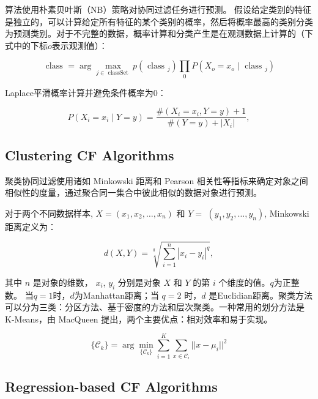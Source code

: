 \documentclass[sigconf]{acmart}
\begin{document}
算法使用朴素贝叶斯（NB）策略对协同过滤任务进行预测。 假设给定类别的特征是独立的，可以计算给定所有特征的某个类别的概率，然后将概率最高的类别分类为预测类别\cite{miyahara2002improvement}。对于不完整的数据，概率计算和分类产生是在观测数据上计算的（下式中的下标$o$表示观测值）：

\begin{equation}
  \text { class }=\arg\max_{j \in \text { classSet }} p\left(\text { class }_{j}\right) \prod_{0} P\left(X_{o}=x_{o} \mid \text { class }_{j}\right)  
\end{equation}

Laplace平滑概率计算并避免条件概率为0：

\begin{equation}
  P\left(X_{i}=x_{i} \mid Y=y\right)=\frac{\#\left(X_{i}=x_{i}, Y=y\right)+1}{\#(Y=y)+\left|X_{i}\right|},
\end{equation}

\subsection{Clustering CF Algorithms}

聚类协同过滤使用诸如 Minkowski 距离和 Pearson 相关性等指标来确定对象之间相似性的度量，通过聚合同一集合中彼此相似的数据对象进行预测。

对于两个不同数据样本, $X=\left(x_{1}, x_{2}, \ldots, x_{n}\right)$ 和 $Y=$ $\left(y_{1}, y_{2}, \ldots, y_{n}\right)$, Minkowski距离定义为：

\begin{equation}
  d(X, Y)=\sqrt[q]{\sum_{i=1}^{n}\left|x_{i}-y_{i}\right|^{q}},  
\end{equation}

其中 $n$ 是对象的维数， $x_i$, $y_i$ 分别是对象 $X$ 和 $Y$ 的第 $i$ 个维度的值。$q$为正整数。 当$q = 1$时，$d$为Manhattan距离；当 $q = 2$ 时，$d$ 是Euclidian距离。聚类方法可以分为三类：分区方法、基于密度的方法和层次聚类。一种常用的划分方法是 K-Means，由 MacQueen \cite{macqueen1967some} 提出，两个主要优点：相对效率和易于实现。

\begin{equation}
  \{\mathcal{C}_k\}=\arg\min_{\{\mathcal{C}_k\}}\sum_{i=1}^K\sum_{x\in\mathcal{C}_i}\vert\vert x-\mu_i\vert\vert^2
\end{equation}

\subsection{Regression-based CF Algorithms}
\end{document}
